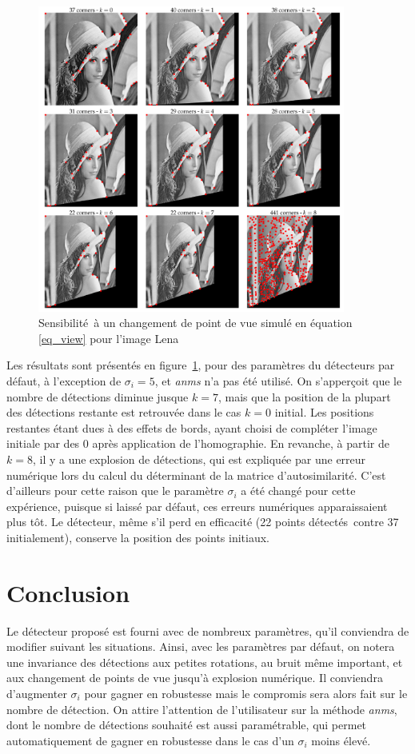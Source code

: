 \documentclass[12pt,a4paper,onecolumn]{article}
\begin{document}
\begin{figure}[H]
	\centering
	\includegraphics[width = 0.9\textwidth]{4_view}
	\caption{Sensibilité à un changement de point de vue simulé en équation \eqref{eq_view} pour l'image Lena}
	\label{fig_view}
\end{figure}

Les résultats sont présentés en figure~\ref{fig_view}, pour des paramètres du détecteurs par défaut, à l'exception de \(\sigma_i = 5 \), et \textit{anms} n'a pas été utilisé. On s'apperçoit que le nombre de détections diminue jusque \(k = 7\), mais que la position de la plupart des détections restante est retrouvée dans le cas \( k = 0\) initial. Les positions restantes étant dues à des effets de bords, ayant choisi de compléter l'image initiale par des 0 après application de l'homographie. En revanche, à partir de \(k = 8\), il y a une explosion de détections, qui est expliquée par une erreur numérique lors du calcul du déterminant de la matrice d'autosimilarité. C'est d'ailleurs pour cette raison que le paramètre \(\sigma_i\) a été changé pour cette expérience, puisque si laissé par défaut, ces erreurs numériques apparaissaient plus tôt. Le détecteur, même s'il perd en efficacité (22 points détectés contre 37 initialement), conserve la position des points initiaux.

\section{Conclusion}

Le détecteur proposé est fourni avec de nombreux paramètres, qu'il conviendra de modifier suivant les situations. Ainsi, avec les paramètres par défaut, on notera une invariance des détections aux petites rotations, au bruit même important, et aux changement de points de vue jusqu'à explosion numérique. Il conviendra d'augmenter \(\sigma_i \) pour gagner en robustesse mais le compromis sera alors fait sur le nombre de détection. On attire l'attention de l'utilisateur sur la méthode \textit{anms}, dont le nombre de détections souhaité est aussi paramétrable, qui permet automatiquement de gagner en robustesse dans le cas d'un \(\sigma_i \) moins élevé.
\end{document}
